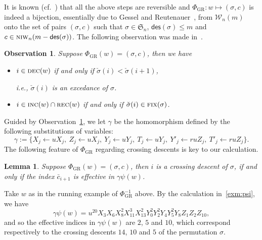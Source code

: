 \documentclass[12pt]{amsart}
\numberwithin{equation}{section}
\theoremstyle{plain}
\newtheorem{lemma}[theorem]{Lemma}
\newtheorem{Observation}[theorem]{Observation}
\theoremstyle{definition}
\def\DEC{\hbox{\rm\textsc{dec}}}
\def\INC{\hbox{\rm\textsc{inc}}}
\def\REC{\hbox{\rm\textsc{rec}}}
\def\NIW{\hbox{\rm\textsc{niw}}}
\def\Fix{\hbox{\rm\textsc{fix}}}
\def\des{\mathsf{des}}
\def\S{\mathfrak{S}}
\def\W{\mathcal{W}}
\begin{document}
It is known (cf.~\cite{fh,fh3}) that all the above steps are reversible and $\Phi_{\mathrm{GR}}:w\mapsto(\sigma,c)$ is indeed a bijection, essentially due to Gessel and Reutenauer~\cite{ge}, from $\W_n(m)$ onto the set of pairs $(\sigma,c)$ such that $\sigma\in\S_n$, $\des(\sigma)\le m$ and $c\in\NIW_n(m-\des(\sigma))$. The following observation was made in~\cite{fh}.

\goodbreak

\begin{Observation}\label{obser:psi}
Suppose $\Phi_{\mathrm{GR}}(w)=(\sigma,c)$, then we have
\begin{itemize}
	\item[(i)] $i\in\DEC(w)$ if and only if $\check\sigma(i)<\check\sigma(i+1)$, 
	
	i.e., $\check\sigma(i)$ is an excedance of $\sigma$.
	\item[(ii)] $i\in\INC(w)\cap\REC(w)$ if and only if $\check\sigma(i)\in\Fix(\sigma)$.
\end{itemize}
\end{Observation}

Guided by Observation~\ref{obser:psi}, we let $\gamma$ be the homomorphism defined by the following substitutions of variables:
	\begin{equation}\label{subs}
	\gamma:=\{X_j\leftarrow u X_j, \
	Z_j\leftarrow u X_j, \
	Y_j\leftarrow u Y_j, \
	T_j\leftarrow u Y_j, \
	Y'_j\leftarrow ru Z_j, \
	T'_j\leftarrow ru Z_j\}.
	\end{equation}
The following feature of $\Phi_{\mathrm{GR}}$ regarding crossing descents is key to our calculation. 
\begin{lemma}\label{lem:xdes-eff}
Suppose $\Phi_{\mathrm{GR}}(w)=(\sigma,c)$, then $i$ is a crossing descent of $\sigma$, if and only if the index $\bar c_{i+1}$ is effective in $\gamma\psi(w)$.
\end{lemma}

Take $w$ as in the running example of $\Phi_{\mathrm{GR}}^{-1}$  above. By the calculation in~\eqref{exm:psi}, we have 
$$
\gamma\psi(w)=u^{20}X_3X_6X_8^2X_{11}^3X_{13}^2Y_0^2Y_2^2Y_4Y_5^2Y_8Z_1Z_2Z_{10},
$$
and so the effective indices in $\gamma\psi(w)$ are $2$, $5$ and $10$, which correspond respectively to the crossing descents $14$, $10$ and $5$ of the permutation $\sigma$.
\end{document}
